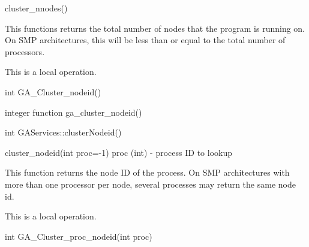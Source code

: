 \documentclass[12pt]{article}
\begin{document}
\begin{pyapi}
\begin{pycode}
cluster_nnodes() 
\end{pycode}
\end{pyapi}
\local
\begin{desc}


This functions returns the total number of nodes that the program is running 
on. On SMP architectures, this will be less than or equal to the total number 
of processors.

This is a  local operation.
\end{desc}


\begin{capi}
\begin{ccode}
int GA_Cluster_nodeid()
\end{ccode}
\end{capi}

\begin{fapi}
\begin{fcode}
integer function ga_cluster_nodeid()
\end{fcode}
\end{fapi}

\begin{cxxapi}
\begin{cxxcode}
int GAServices::clusterNodeid()
\end{cxxcode}
\end{cxxapi}

\begin{pyapi}
\begin{pycode}
cluster_nodeid(int proc=-1)  
   proc (int)    - process ID to lookup
\end{pycode}
\end{pyapi}
\local

\begin{desc}

This function returns the node ID of the process. On SMP architectures with more 
than one processor per node, several processes may return the same node id.

This is a  local operation.
\end{desc}


\begin{capi}
\begin{ccode}
int GA_Cluster_proc_nodeid(int proc)
\end{ccode}
\begin{funcargs}
\end{funcargs}
\end{capi}
\end{document}
